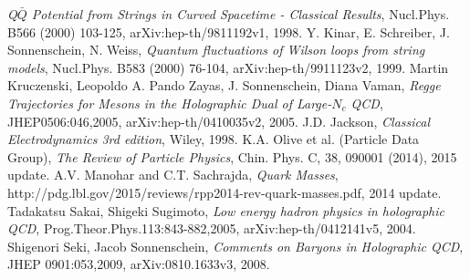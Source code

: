 \documentclass[11pt,a4paper]{article}
\begin{document}
\begin{thebibliography}{9}
	\emph{Q$\bar{Q}$ Potential from Strings in Curved Spacetime - Classical Results},
	Nucl.Phys. B566 (2000) 103-125,
	arXiv:hep-th/9811192v1,
	1998.
	Y. Kinar, E. Schreiber, J. Sonnenschein, N. Weiss,
	\emph{Quantum fluctuations of Wilson loops from string models},
	Nucl.Phys. B583 (2000) 76-104,
	arXiv:hep-th/9911123v2,
	1999.
	Martin Kruczenski, Leopoldo A. Pando Zayas, J. Sonnenschein, Diana Vaman,
	\emph{Regge Trajectories for Mesons in the Holographic Dual of Large-$N_c$ QCD},
	JHEP0506:046,2005,
	arXiv:hep-th/0410035v2,
	2005.
	J.D. Jackson,
	\emph{Classical Electrodynamics 3rd edition},
	Wiley,
	1998.	
	K.A. Olive et al. (Particle Data Group),
	\emph{The Review of Particle Physics},
	Chin. Phys. C, 38, 090001 (2014),
	2015 update.
	A.V. Manohar and C.T. Sachrajda,
	\emph{Quark Masses},
	http://pdg.lbl.gov/2015/reviews/rpp2014-rev-quark-masses.pdf,
	2014 update.	
	Tadakatsu Sakai, Shigeki Sugimoto,
	\emph{Low energy hadron physics in holographic QCD},
	Prog.Theor.Phys.113:843-882,2005,
	arXiv:hep-th/0412141v5,
	2004.
	Shigenori Seki, Jacob Sonnenschein,
	\emph{Comments on Baryons in Holographic QCD},
	JHEP 0901:053,2009,
	arXiv:0810.1633v3,
	2008.	
	
\end{thebibliography}
\end{document}
